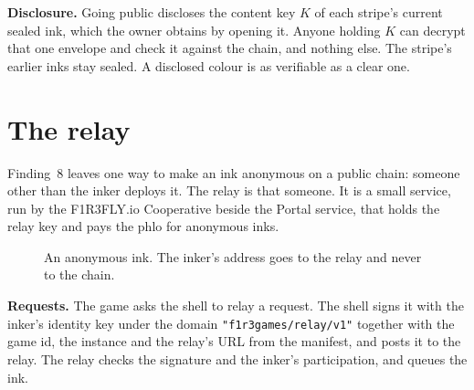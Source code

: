 \documentclass[11pt,a4paper]{article}
\newcommand{\code}[1]{\texttt{#1}}
\newcounter{req}
\begin{document}
\textbf{Disclosure.} Going public discloses the content key $K$ of each stripe's current sealed
ink, which the owner obtains by opening it. Anyone holding $K$ can decrypt that one envelope and
check it against the chain, and nothing else. The stripe's earlier inks stay sealed. A disclosed
colour is as verifiable as a clear one.

\section{The relay}\label{sec:relay}

Finding~8 leaves one way to make an ink anonymous on a public chain: someone other than the inker
deploys it. The relay is that someone. It is a small service, run by the F1R3FLY.io Cooperative
beside the Portal service, that holds the relay key and pays the phlo for anonymous inks.

\begin{figure}[h]
\centering
{}
\caption{An anonymous ink. The inker's address goes to the relay and never to the chain.}
\label{fig:relayflow}
\end{figure}

\textbf{Requests.} The game asks the shell to relay a request. The shell signs it with the
inker's identity key under the domain \code{"f1r3games/relay/v1"} together with the game id, the
instance and the relay's URL from the manifest, and posts it to the relay. The relay checks the
signature and the inker's participation, and queues the ink.
\end{document}

